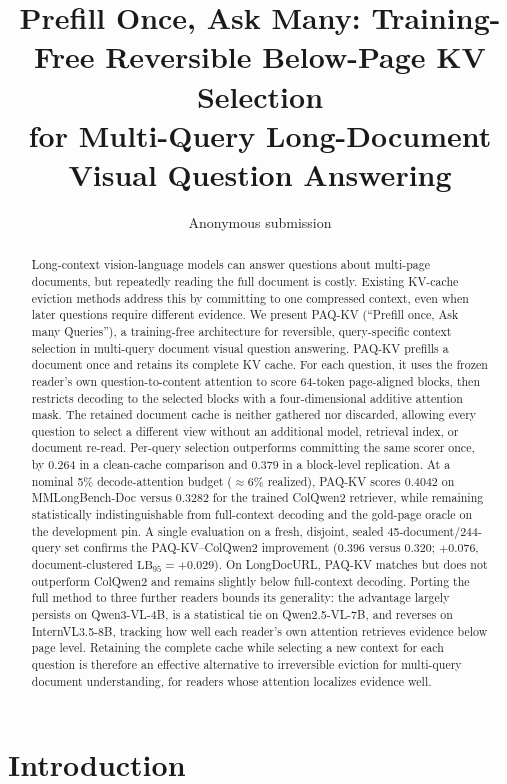 \documentclass[letterpaper]{article} %
\title{Prefill Once, Ask Many: Training-Free Reversible Below-Page KV Selection\\for Multi-Query Long-Document Visual Question Answering}
\author{
    Anonymous submission
}
\newcommand{\paqc}{\textsc{PAQ-KV}}
\newcommand{\lb}{\mathrm{LB}_{95}}
\begin{document}
\maketitle

\begin{abstract}
Long-context vision-language models can answer questions about multi-page documents, but repeatedly reading the full document is costly. Existing KV-cache eviction methods address this by committing to one compressed context, even when later questions require different evidence. We present \paqc{} (``Prefill once, Ask many Queries''), a training-free architecture for reversible, query-specific context selection in multi-query document visual question answering. \paqc{} prefills a document once and retains its complete KV cache. For each question, it uses the frozen reader's own question-to-content attention to score 64-token page-aligned blocks, then restricts decoding to the selected blocks with a four-dimensional additive attention mask. The retained document cache is neither gathered nor discarded, allowing every question to select a different view without an additional model, retrieval index, or document re-read. Per-query selection outperforms committing the same scorer once, by $0.264$ in a clean-cache comparison and $0.379$ in a block-level replication. At a nominal 5\% decode-attention budget (${\approx}6\%$ realized), \paqc{} scores $0.4042$ on MMLongBench-Doc versus $0.3282$ for the trained ColQwen2 retriever, while remaining statistically indistinguishable from full-context decoding and the gold-page oracle on the development pin. A single evaluation on a fresh, disjoint, sealed 45-document/244-query set confirms the \paqc{}--ColQwen2 improvement ($0.396$ versus $0.320$; $+0.076$, document-clustered $\lb=+0.029$). On LongDocURL, \paqc{} matches but does not outperform ColQwen2 and remains slightly below full-context decoding. Porting the full method to three further readers bounds its generality: the advantage largely persists on Qwen3-VL-4B, is a statistical tie on Qwen2.5-VL-7B, and reverses on InternVL3.5-8B, tracking how well each reader's own attention retrieves evidence below page level. Retaining the complete cache while selecting a new context for each question is therefore an effective alternative to irreversible eviction for multi-query document understanding, for readers whose attention localizes evidence well.
\end{abstract}

\section{Introduction}\label{sec:intro}
\end{document}
